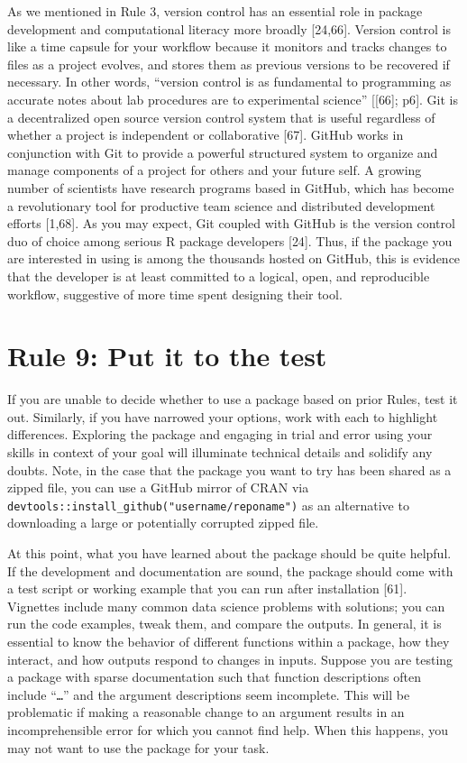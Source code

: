 \documentclass[10pt,letterpaper]{article}
\begin{document}
As we mentioned in Rule 3, version control has an essential role in
package development and computational literacy more broadly {[}24,66{]}.
Version control is like a time capsule for your workflow because it
monitors and tracks changes to files as a project evolves, and stores
them as previous versions to be recovered if necessary. In other words,
``version control is as fundamental to programming as accurate notes
about lab procedures are to experimental science'' {[}{[}66{]}; p6{]}.
Git is a decentralized open source version control system that is useful
regardless of whether a project is independent or collaborative
{[}67{]}. GitHub works in conjunction with Git to provide a powerful
structured system to organize and manage components of a project for
others and your future self. A growing number of scientists have
research programs based in GitHub, which has become a revolutionary tool
for productive team science and distributed development efforts
{[}1,68{]}. As you may expect, Git coupled with GitHub is the version
control duo of choice among serious R package developers {[}24{]}. Thus,
if the package you are interested in using is among the thousands hosted
on GitHub, this is evidence that the developer is at least committed to
a logical, open, and reproducible workflow, suggestive of more time
spent designing their tool.

\hypertarget{rule-9-put-it-to-the-test}{%
\section{Rule 9: Put it to the test}\label{rule-9-put-it-to-the-test}}

If you are unable to decide whether to use a package based on prior
Rules, test it out. Similarly, if you have narrowed your options, work
with each to highlight differences. Exploring the package and engaging
in trial and error using your skills in context of your goal will
illuminate technical details and solidify any doubts. Note, in the case
that the package you want to try has been shared as a zipped file, you
can use a GitHub mirror of CRAN via
\texttt{devtools::install\_github("username/reponame")} as an
alternative to downloading a large or potentially corrupted zipped file.

At this point, what you have learned about the package should be quite
helpful. If the development and documentation are sound, the package
should come with a test script or working example that you can run after
installation {[}61{]}. Vignettes include many common data science
problems with solutions; you can run the code examples, tweak them, and
compare the outputs. In general, it is essential to know the behavior of
different functions within a package, how they interact, and how outputs
respond to changes in inputs. Suppose you are testing a package with
sparse documentation such that function descriptions often include
``\texttt{\ldots{}}'' and the argument descriptions seem incomplete.
This will be problematic if making a reasonable change to an argument
results in an incomprehensible error for which you cannot find help.
When this happens, you may not want to use the package for your task.
\end{document}
